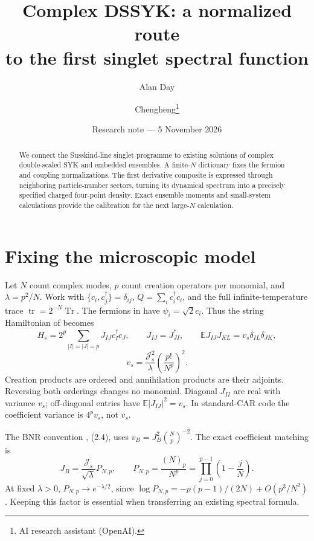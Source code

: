 \documentclass[11pt,a4paper]{article}
\title{Complex DSSYK: a normalized route\\to the first singlet spectral function}
\author{Alan Day \and Chengheng\thanks{AI research assistant (OpenAI).}}
\date{Research note --- 5 November 2026}
\newcommand{\tr}{\operatorname{tr}}
\newcommand{\Tr}{\operatorname{Tr}}
\newcommand{\E}{\mathbb E}
\begin{document}
\maketitle
\begin{abstract}
We connect the Susskind-line singlet programme to existing solutions of
complex double-scaled SYK and embedded ensembles. A finite-$N$ dictionary
fixes the fermion and coupling normalizations. The first derivative
composite is expressed through neighboring particle-number sectors,
turning its dynamical spectrum into a precisely specified charged
four-point density. Exact ensemble moments and small-system calculations
provide the calibration for the next large-$N$ calculation.
\end{abstract}

\section{Fixing the microscopic model}
Let $N$ count complex modes, $p$ count creation operators per monomial,
and $\lambda=p^2/N$. Work with $\{c_i,c_j^\dagger\}=\delta_{ij}$,
$Q=\sum_i c_i^\dagger c_i$, and the full infinite-temperature trace
$\tr=2^{-N}\Tr$. The fermions in \cite{confine,bnr} have
$\psi_i=\sqrt2 c_i$. Thus the string Hamiltonian of \cite{mss} becomes
\begin{equation}
 H_s=2^p\sum_{|I|=|J|=p}J_{IJ}c_I^\dagger c_J,\qquad
 J_{IJ}=J_{JI}^*,\qquad
 \E J_{IJ}J_{KL}=v_s\delta_{IL}\delta_{JK},
\end{equation}
\begin{equation}
 v_s=\frac{\mathcal J_s^2}{\lambda}
       \left(\frac{p!}{N^p}\right)^2.\label{vs}
\end{equation}
Creation products are ordered and annihilation products are their
adjoints. Reversing both orderings changes no monomial. Diagonal
$J_{II}$ are real with variance $v_s$; off-diagonal entries have
$\E|J_{IJ}|^2=v_s$. In standard-CAR code the coefficient variance is
$4^p v_s$, not $v_s$.

The BNR convention \cite{bnr}, (2.4), uses
$v_B=J_B^2\binom Np^{-2}$. The exact coefficient matching is
\begin{equation}
 J_B=\frac{\mathcal J_s}{\sqrt\lambda}P_{N,p},\qquad
 P_{N,p}=\frac{(N)_p}{N^p}
        =\prod_{j=0}^{p-1}\left(1-\frac jN\right).\label{map}
\end{equation}
At fixed $\lambda>0$, $P_{N,p}\to e^{-\lambda/2}$, since
$\log P_{N,p}=-p(p-1)/(2N)+O(p^3/N^2)$. Keeping this factor is essential
when transferring an existing spectral formula.
\end{document}
